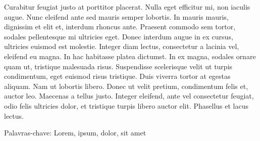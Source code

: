 \begin{newpage}
	Curabitur feugiat justo at porttitor placerat. Nulla eget efficitur mi, non iaculis augue. Nunc eleifend ante sed mauris semper lobortis. In mauris mauris, dignissim et elit et, interdum rhoncus ante. Praesent commodo sem tortor, sodales pellentesque mi ultricies eget. Donec interdum augue in ex cursus, ultricies euismod est molestie. Integer diam lectus, consectetur a lacinia vel, eleifend eu magna. In hac habitasse platea dictumst. In ex magna, sodales ornare quam ut, tristique malesuada risus. Suspendisse scelerisque velit ut turpis condimentum, eget euismod risus tristique. Duis viverra tortor at egestas aliquam. Nam ut lobortis libero. Donec ut velit pretium, condimentum felis et, auctor leo. Maecenas a tellus justo. Integer eleifend, ante vel consectetur feugiat, odio felis ultricies dolor, et tristique turpis libero auctor elit. Phasellus et lacus lectus. 
  
 	\vspace{1.5\baselineskip} %
	\par %
	\noindent %
	Palavras-chave: Lorem, ipsum, dolor, sit amet
	\par %

\end{newpage}
